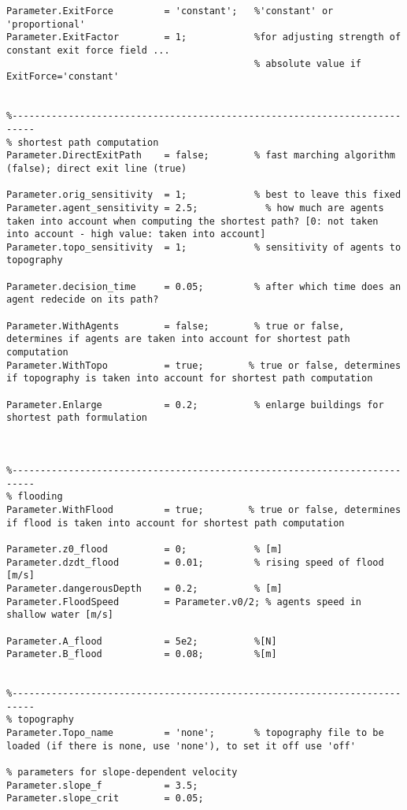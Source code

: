 \begin{lstlisting}[breaklines]
Parameter.ExitForce         = 'constant';   %'constant' or 'proportional'
Parameter.ExitFactor        = 1;            %for adjusting strength of constant exit force field ...
                                            % absolute value if ExitForce='constant'


%--------------------------------------------------------------------------
% shortest path computation
Parameter.DirectExitPath    = false;     	% fast marching algorithm (false); direct exit line (true)

Parameter.orig_sensitivity	= 1;            % best to leave this fixed
Parameter.agent_sensitivity	= 2.5;            % how much are agents taken into account when computing the shortest path? [0: not taken into account - high value: taken into account]
Parameter.topo_sensitivity 	= 1;            % sensitivity of agents to topography

Parameter.decision_time   	= 0.05;         % after which time does an agent redecide on its path?

Parameter.WithAgents        = false;        % true or false, determines if agents are taken into account for shortest path computation
Parameter.WithTopo          = true;        % true or false, determines if topography is taken into account for shortest path computation

Parameter.Enlarge           = 0.2;          % enlarge buildings for shortest path formulation



%--------------------------------------------------------------------------
% flooding
Parameter.WithFlood         = true;        % true or false, determines if flood is taken into account for shortest path computation

Parameter.z0_flood          = 0;            % [m]
Parameter.dzdt_flood        = 0.01;         % rising speed of flood [m/s]
Parameter.dangerousDepth    = 0.2;          % [m]
Parameter.FloodSpeed        = Parameter.v0/2; % agents speed in shallow water [m/s]

Parameter.A_flood           = 5e2;          %[N]
Parameter.B_flood           = 0.08;         %[m]


%--------------------------------------------------------------------------
% topography
Parameter.Topo_name         = 'none';       % topography file to be loaded (if there is none, use 'none'), to set it off use 'off'

% parameters for slope-dependent velocity
Parameter.slope_f           = 3.5;
Parameter.slope_crit        = 0.05;



\end{lstlisting}
